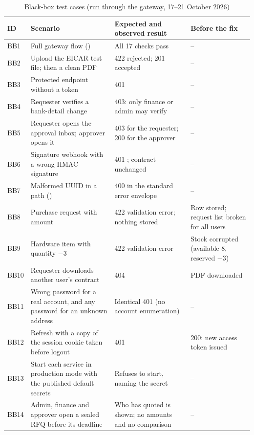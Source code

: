 \begin{table}[H]
\centering\tablestyle
\setlength{\tabcolsep}{3pt}
\renewcommand{\arraystretch}{1.1}
\caption{Black-box test cases (run through the gateway, 17--21 October 2026)}\label{tab:bb}
\begin{tabularx}{\textwidth}{|C{0.06\textwidth}|L{0.30\textwidth}|Y|L{0.17\textwidth}|}
\hline
\textbf{ID} & \textbf{Scenario} & \textbf{Expected and observed result} & \textbf{Before the fix} \\ \hline
BB1 & Full gateway flow () & All 17 checks pass & -- \\ \hline
BB2 & Upload the EICAR test file; then a clean PDF & 422 rejected; 201 accepted & -- \\ \hline
BB3 & Protected endpoint without a token & 401  & -- \\ \hline
BB4 & Requester verifies a bank-detail change & 403: only finance or admin may verify & -- \\ \hline
BB5 & Requester opens the approval inbox; approver opens it & 403 for the requester; 200 for the approver & -- \\ \hline
BB6 & Signature webhook with a wrong HMAC signature & 401 ; contract unchanged & -- \\ \hline
BB7 & Malformed UUID in a path () & 400 in the standard error envelope & -- \\ \hline
BB8 & Purchase request with amount  & 422 validation error; nothing stored & Row stored; request list broken for all users \\ \hline
BB9 & Hardware item with quantity $-3$ & 422 validation error & Stock corrupted (available 8, reserved $-3$) \\ \hline
BB10 & Requester downloads another user's contract & 404 & PDF downloaded \\ \hline
BB11 & Wrong password for a real account, and any password for an unknown address & Identical 401  (no account enumeration) & -- \\ \hline
BB12 & Refresh with a copy of the session cookie taken before logout & 401  & 200: new access token issued \\ \hline
BB13 & Start each service in production mode with the published default secrets & Refuses to start, naming the secret & -- \\ \hline
BB14 & Admin, finance and approver open a sealed RFQ before its deadline & Who has quoted is shown; no amounts and no comparison & -- \\ \hline

\end{tabularx}
\end{table}
